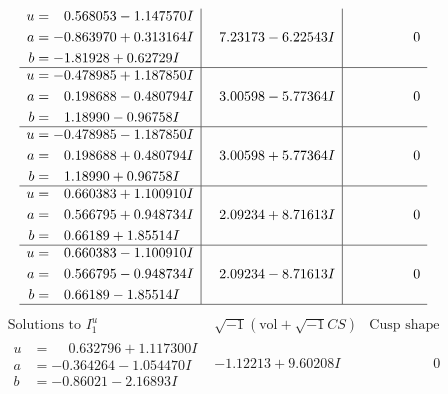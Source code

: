 \documentclass[1p]{elsarticle_modified}
\theoremstyle{definition}
\newcommand{\I}{\sqrt{-1}}
\begin{document}
$$\begin{array}{c|c|c}
\begin{aligned}
u &= \phantom{-}0.568053 - 1.147570 I \\
a &= -0.863970 + 0.313164 I \\
b &= -1.81928 + 0.62729 I\end{aligned}
 & \phantom{-}7.23173 - 6.22543 I & \phantom{-0.000000 } 0 \\ \hline\begin{aligned}
u &= -0.478985 + 1.187850 I \\
a &= \phantom{-}0.198688 - 0.480794 I \\
b &= \phantom{-}1.18990 - 0.96758 I\end{aligned}
 & \phantom{-}3.00598 - 5.77364 I & \phantom{-0.000000 } 0 \\ \hline\begin{aligned}
u &= -0.478985 - 1.187850 I \\
a &= \phantom{-}0.198688 + 0.480794 I \\
b &= \phantom{-}1.18990 + 0.96758 I\end{aligned}
 & \phantom{-}3.00598 + 5.77364 I & \phantom{-0.000000 } 0 \\ \hline\begin{aligned}
u &= \phantom{-}0.660383 + 1.100910 I \\
a &= \phantom{-}0.566795 + 0.948734 I \\
b &= \phantom{-}0.66189 + 1.85514 I\end{aligned}
 & \phantom{-}2.09234 + 8.71613 I & \phantom{-0.000000 } 0 \\ \hline\begin{aligned}
u &= \phantom{-}0.660383 - 1.100910 I \\
a &= \phantom{-}0.566795 - 0.948734 I \\
b &= \phantom{-}0.66189 - 1.85514 I\end{aligned}
 & \phantom{-}2.09234 - 8.71613 I & \phantom{-0.000000 } 0\\
 \hline 
 \end{array}$$\newpage$$\begin{array}{c|c|c}  
\text{Solutions to }I^u_{1}& \I (\text{vol} + \sqrt{-1}CS) & \text{Cusp shape}\\
 \hline 
\begin{aligned}
u &= \phantom{-}0.632796 + 1.117300 I \\
a &= -0.364264 - 1.054470 I \\
b &= -0.86021 - 2.16893 I\end{aligned}
 & -1.12213 + 9.60208 I & \phantom{-0.000000 } 0 \\ \hline\begin{aligned}

\end{aligned}
\end{array}$$
\end{document}
